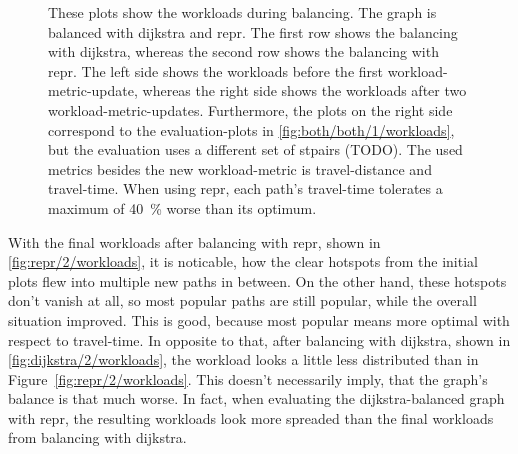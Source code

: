         \begin{figure}[hbp]
            \centering%
            \hfill%

            \hfill%
            \caption[Workloads during balancing in comparison]{%
                These plots show the workloads during \gls{balancing}.
                The graph is balanced with \gls{dijkstra} and \gls{repr}.
                The first row shows the \gls{balancing} with \gls{dijkstra}, whereas the second row shows the \gls{balancing} with \gls{repr}.
                The left side shows the workloads before the first workload-\gls{metric}-update, whereas the right side shows the workloads after two workload-\gls{metric}-updates.
                Furthermore, the plots on the right side correspond to the evaluation-plots in \vref{fig:both/both/1/workloads}, but the evaluation uses a different set of \glspl{stpair} (TODO).
                The used \glspl{metric} besides the new workload-\gls{metric} is travel-distance and travel-time.
                When using \gls{repr}, each path's travel-time tolerates a maximum of \si{\num{40} \percent} worse than its optimum.
                \label{fig:both/2/workloads}
            }
        \end{figure}

        With the final workloads after \gls{balancing} with \gls{repr}, shown in \vref{fig:repr/2/workloads}, it is noticable, how the clear hotspots from the initial plots flew into multiple new paths in between.
        On the other hand, these hotspots don't vanish at all, so most popular paths are still popular, while the overall situation improved.
        This is good, because most popular means more optimal with respect to travel-time.
        In opposite to that, after \gls{balancing} with \gls{dijkstra}, shown in \vref{fig:dijkstra/2/workloads}, the workload looks a little less distributed than in Figure~\ref{fig:repr/2/workloads}.
        This doesn't necessarily imply, that the graph's balance is that much worse.
        In fact, when evaluating the \gls{dijkstra}-balanced graph with \gls{repr}, the resulting workloads look more spreaded than the final workloads from \gls{balancing} with \gls{dijkstra}.

